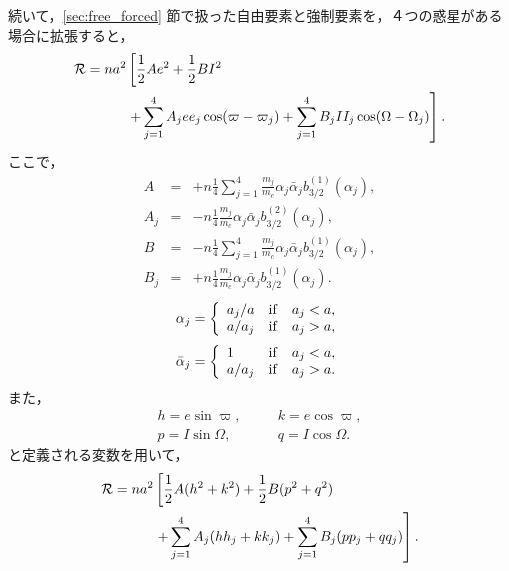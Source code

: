 \documentclass[11pt,a4paper,oneside,onecolumn]{jreport}
\begin{document}
続いて，\ref{sec:free_forced} 節で扱った自由要素と強制要素を，４つの惑星がある場合に拡張すると，
\begin{equation}
\begin{split}
{\cal R} = n a^2 & \left[ \frac{1}{2} A e^2 + \frac{1}{2} B I^2 \right. \\
& \left. + \sum_{j = 1}^4  A_j e e_j \cos (\varpi - \varpi_j) + \sum_{j = 1}^4 B_j I I_j \cos (\Omega - \Omega_j) \right]. \\
\end{split} \label{}
\end{equation} 
ここで，
\begin{eqnarray}
A & = & + n \frac{1}{4} \sum_{j = 1}^4 \frac{m_j}{m_c} \alpha_j \bar{\alpha}_j b_{3/2}^{(1)} (\alpha_j), \label{eq:A_test_4planet} \\
A_j & = & - n \frac{1}{4} \frac{m_j}{m_c} \alpha_j \bar{\alpha}_j b_{3/2}^{(2)} (\alpha_j), \label{eq:A_j_test_4planet} \\
B & = & - n \frac{1}{4} \sum_{j = 1}^4 \frac{m_j}{m_c} \alpha_j \bar{\alpha}_j b_{3/2}^{(1)} (\alpha_j), \label{eq:B_test_4planet} \\
B_j & = & + n \frac{1}{4} \frac{m_j}{m_c} \alpha_j \bar{\alpha}_j b_{3/2}^{(1)} (\alpha_j). \label{eq:B_j_test_4planet}
\end{eqnarray}
\begin{equation}
\alpha_j = \left\{
\begin{array}{lll}
a_j / a & {\rm if} & a_j < a, \\
a / a_j & {\rm if} & a_j > a,
\end{array}
\right.
\end{equation}
\begin{equation}
\bar{\alpha}_j = \left\{
\begin{array}{lll}
1 & {\rm if} & a_j < a, \\
a / a_j & {\rm if} & a_j > a.
\end{array}
\right.
\end{equation}
また，
\begin{eqnarray}
h = e \sin \varpi, & \quad & k = e \cos \varpi, \\
p = I \sin \Omega, & \quad & q = I \cos \Omega.
\end{eqnarray}
と定義される変数を用いて，
\begin{equation}
\begin{split}
{\cal R} = n a^2 & \left[ \frac{1}{2} A (h^2 + k^2) + \frac{1}{2} B (p^2 + q^2) \right. \\
& \left. + \sum_{j = 1}^4 A_j (h h_j + k k_j) + \sum_{j = 1}^4 B_j (p p_j + q q_j) \right]. \\
\end{split} \label{}
\end{equation}
\end{document}
